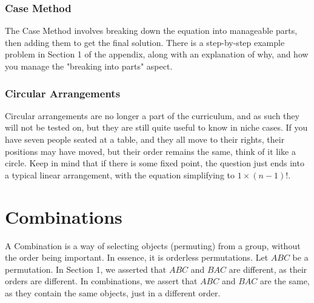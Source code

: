 \documentclass[final,1p,12pt]{elsarticle}
\begin{document}
        \subsubsection{Case Method}
        The Case Method involves breaking down the equation into manageable parts, then adding them to get the final solution. There is a step-by-step example problem in Section 1 of the appendix, along with an explanation of why, and how you manage the "breaking into parts" aspect.

    \clearpage
    
        \subsubsection{Circular Arrangements}
        Circular arrangements are no longer a part of the curriculum, and as such they will not be tested on, but they are still quite useful to know in niche cases. If you have seven people seated at a table, and they all move to their rights, their positions may have moved, but their order remains the same, think of it like a circle. Keep in mind that if there is some fixed point, the question just ends into a typical linear arrangement, with the equation simplifying to $1 \times (n-1)!$.
        
\section{Combinations}
A Combination is a way of selecting objects (permuting) from a group, without the order being important. In essence, it is orderless permutations. Let $ABC$ be a permutation. In Section 1, we asserted that $ABC$ and $BAC$ are different, as their orders are different. In combinations, we assert that $ABC$ and $BAC$ are the same, as they contain the same objects, just in a different order.
\end{document}
